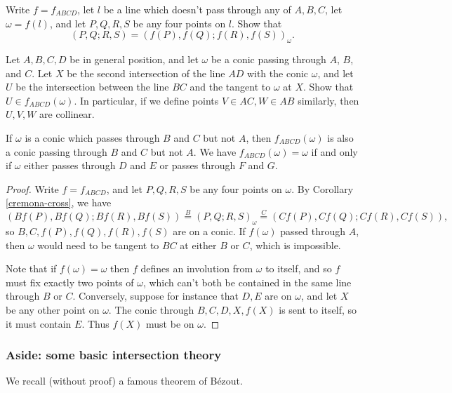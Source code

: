 \begin{exer}  Write $f = f_{ABCD}$, let $l$ be a line which doesn't pass through any of $A,B,C$, let $\omega = f(l)$, and let $P,Q,R,S$ be any four points on $l$. Show that
\[
(P,Q;R,S) = (f(P),f(Q);f(R),f(S))_\omega.
\]
\end{exer}

\begin{exer} Let $A,B,C,D$ be in general position, and let $\omega$ be a conic passing through $A$, $B$, and $C$. Let $X$ be the second intersection of the line $AD$ with the conic $\omega$, and let $U$ be the intersection between the line $BC$ and the tangent to $\omega$ at $X$. Show that $U \in f_{ABCD}(\omega)$. In particular, if we define points $V \in AC, W \in AB$ similarly, then $U,V,W$ are collinear.
\end{exer}

\begin{thm}\label{cremona-two} If $\omega$ is a conic which passes through $B$ and $C$ but not $A$, then $f_{ABCD}(\omega)$ is also a conic passing through $B$ and $C$ but not $A$. We have $f_{ABCD}(\omega) = \omega$ if and only if $\omega$ either passes through $D$ and $E$ or passes through $F$ and $G$.
\end{thm}
\begin{proof} Write $f = f_{ABCD}$, and let $P,Q,R,S$ be any four points on $\omega$. By Corollary \ref{cremona-cross}, we have
\[
(Bf(P),Bf(Q);Bf(R),Bf(S)) \stackrel{B}{=} (P,Q;R,S)_\omega \stackrel{C}{=} (Cf(P),Cf(Q);Cf(R),Cf(S)),
\]
so $B,C,f(P),f(Q),f(R),f(S)$ are on a conic. If $f(\omega)$ passed through $A$, then $\omega$ would need to be tangent to $BC$ at either $B$ or $C$, which is impossible.

Note that if $f(\omega) = \omega$ then $f$ defines an involution from $\omega$ to itself, and so $f$ must fix exactly two points of $\omega$, which can't both be contained in the same line through $B$ or $C$. Conversely, suppose for instance that $D,E$ are on $\omega$, and let $X$ be any other point on $\omega$. The conic through $B,C,D,X,f(X)$ is sent to itself, so it must contain $E$. Thus $f(X)$ must be on $\omega$.
\end{proof}

\subsubsection{Aside: some basic intersection theory}

We recall (without proof) a famous theorem of B\'ezout.

